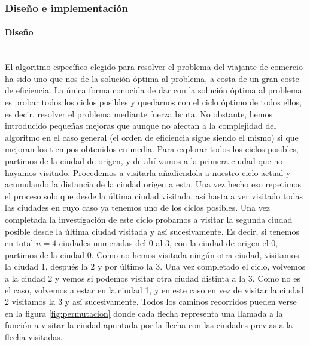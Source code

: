 \documentclass{article}
\newcommand{\myparagraph}[1]{\paragraph{#1}\mbox{}\\}
\begin{document}
\subsubsection{Diseño e implementación} %
\myparagraph{Diseño}
El algoritmo específico elegido para resolver el problema del viajante de comercio ha sido uno que nos de la solución óptima al problema, a costa de un gran coste de eficiencia. La única forma conocida de dar con la solución óptima al problema es probar todos los ciclos posibles y quedarnos con el ciclo óptimo de todos ellos, es decir, resolver el problema mediante fuerza bruta. No obstante, hemos introducido pequeñas mejoras que aunque no afectan a la complejidad del algoritmo en el caso general (el orden de eficiencia sigue siendo el mismo) si que mejoran los tiempos obtenidos en media.
\newline
\newline
Para explorar todos los ciclos posibles, partimos de la ciudad de origen, y de ahí vamos a la primera ciudad que no hayamos visitado. Procedemos a visitarla añadiendola a nuestro ciclo actual y acumulando la distancia de la ciudad origen a esta. Una vez hecho eso repetimos el proceso solo que desde la última ciudad visitada, así hasta a ver visitado todas las ciudades en cuyo caso ya tenemos uno de los ciclos posibles. Una vez completada la investigación de este ciclo probamos a visitar la segunda ciudad posible desde la última ciudad visitada y así sucesivamente. Es decir, si tenemos en total $n = 4$ ciudades numeradas del 0 al 3, con la ciudad de origen el 0, partimos de la ciudad 0. Como no hemos visitada ningún otra ciudad, visitamos la ciudad 1, después la 2 y por último la 3. Una vez completado el ciclo, volvemos a la ciudad 2 y vemos si podemos visitar otra ciudad distinta a la 3. Como no es el caso, volvemos a estar en la ciudad 1, y en este caso en vez de visitar la ciudad 2 visitamos la 3 y así sucesivamente.
\newline 
Todos los caminos recorridos pueden verse en la figura \ref{fig:permutacion} donde cada flecha representa una llamada a la función a visitar la ciudad apuntada por la flecha con las ciudades previas a la flecha visitadas.
\newline
\end{document}
